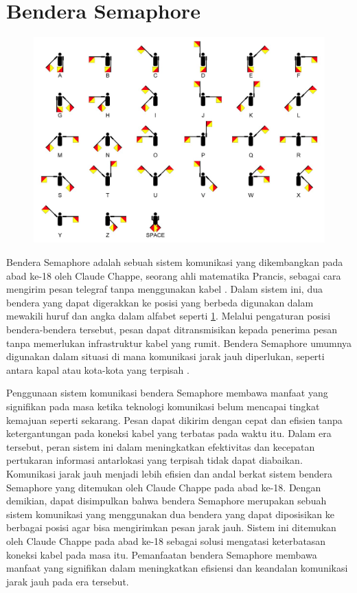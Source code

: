 \section{Bendera Semaphore}
\begin{figure}[hbt!]
  \centering
	\includegraphics[width=0.7\linewidth]{gambar/bener/Semaphore-Pose.jpg}
	\label{fig:BenderaSemaphore}
\end{figure}

Bendera Semaphore adalah sebuah sistem komunikasi yang dikembangkan pada abad ke-18 oleh Claude Chappe, seorang ahli matematika Prancis, sebagai cara mengirim pesan telegraf tanpa menggunakan kabel \cite{8752707}. Dalam sistem ini, dua bendera yang dapat digerakkan ke posisi yang berbeda digunakan dalam mewakili huruf dan angka dalam alfabet seperti \ref{fig:BenderaSemaphore}. Melalui pengaturan posisi bendera-bendera tersebut, pesan dapat ditransmisikan kepada penerima pesan tanpa memerlukan infrastruktur kabel yang rumit. Bendera Semaphore umumnya digunakan dalam situasi di mana komunikasi jarak jauh diperlukan, seperti antara kapal atau kota-kota yang terpisah \cite{gundogdu2019semaphore}.

Penggunaan sistem komunikasi bendera Semaphore membawa manfaat yang signifikan pada masa ketika teknologi komunikasi belum mencapai tingkat kemajuan seperti sekarang. Pesan dapat dikirim dengan cepat dan efisien tanpa ketergantungan pada koneksi kabel yang terbatas pada waktu itu. Dalam era tersebut, peran sistem ini dalam meningkatkan efektivitas dan kecepatan pertukaran informasi antarlokasi yang terpisah tidak dapat diabaikan. Komunikasi jarak jauh menjadi lebih efisien dan andal berkat sistem bendera Semaphore yang ditemukan oleh Claude Chappe pada abad ke-18. Dengan demikian, dapat disimpulkan bahwa bendera Semaphore merupakan sebuah sistem komunikasi yang menggunakan dua bendera yang dapat diposisikan ke berbagai posisi agar bisa mengirimkan pesan jarak jauh. Sistem ini ditemukan oleh Claude Chappe pada abad ke-18 sebagai solusi mengatasi keterbatasan koneksi kabel pada masa itu. Pemanfaatan bendera Semaphore membawa manfaat yang signifikan dalam meningkatkan efisiensi dan keandalan komunikasi jarak jauh pada era tersebut.

